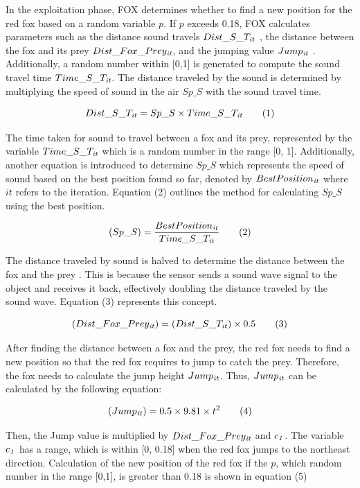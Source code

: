 \documentclass[
]{article}
\begin{document}
\begin{justify}
In the exploitation phase, FOX determines whether to find a new position for the red fox based on a random variable \(p\). If \(p\) exceeds 0.18, FOX calculates parameters such as the distance sound travels \(Dist\_S\_T_{\text{\textit{it}}}\)
 , the distance between the fox and its prey  \(Dist\_Fox\_Prey_{\text{\textit{it}}}\), and the jumping value \(Jump_{\text{\textit{it}}}\) . Additionally, a random number within [0,1] is generated to compute the sound travel time \(Time\_S\_T_{\text{\textit{it}}}\). The distance traveled by the sound is determined by multiplying the speed of sound in the air \(Sp\_S\) with the sound travel time.

\[
Dist\_S\_T_{\text{\textit{it}}} = Sp\_S \times Time\_S\_T_{\text{\textit{it}}} \tag{1}
\]


The time taken for sound to travel between a fox and its prey, represented by the variable \(Time\_S\_T_{\text{\textit{it}}}\) which is a random number in the range [0, 1]. Additionally, another equation is introduced to determine  \(Sp\_S\) which represents the speed of sound based on the best position found so far, denoted by \(BestPosition_{\text{\textit{it}}}\) where \(it\) refers to the iteration. Equation (2) outlines the method for calculating \(Sp\_S\) using the best position.

\[
(Sp\_S) = \frac{BestPosition_{\text{\textit{it}}}}{Time\_S\_T_{\text{\textit{it}}}} \tag{2}
\]

The distance traveled by sound is halved to determine the distance between the fox and the prey . This is because the sensor sends a sound wave signal to the object and receives it back, effectively doubling the distance traveled by the sound wave. Equation (3) represents this concept.

\[
(Dist\_Fox\_Prey_{\text{\textit{it}}}) = (Dist\_S\_T_{\text{\textit{it}}}) \times 0.5 \tag{3}
\]


After finding the distance between a fox and the prey, the red fox needs to find a new position so that the red fox requires to jump to catch the prey. Therefore, the fox needs to calculate the jump height \(Jump_{\text{\textit{it}}}\). Thus, \(Jump_{\text{\textit{it}}}\) can be calculated by the following equation:

\[
(Jump_{\text{\textit{it}}}) = 0.5 \times 9.81 \times t^2 \tag{4}
\]


Then, the Jump value is multiplied by \(Dist\_Fox\_Prey_{\text{\textit{it}}}\) and \(c_{\text{\textit{1}}}\). The variable \(c_{\text{\textit{1}}}\) has a range, which is within [0, 0.18] when the red fox jumps to the northeast direction. Calculation of the new position of the red fox if the \( p\), which random number in the range [0,1], is greater than 0.18 is shown in equation (5)


\end{justify}
\end{document}

